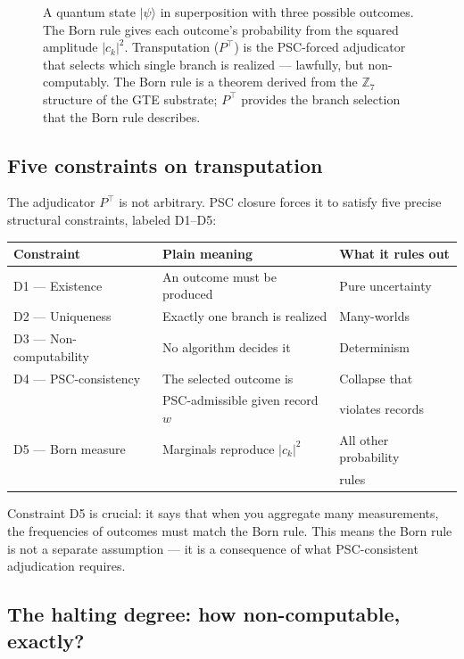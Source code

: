 \documentclass[11pt,a4paper]{article}
\begin{document}
\begin{figure}[h]
\begin{tikzpicture}
\end{tikzpicture}
\caption{A quantum state $|\psi\rangle$ in superposition with three possible outcomes.
  The Born rule gives each outcome's probability from the squared amplitude $|c_k|^2$.
  Transputation ($P^\top$) is the PSC-forced adjudicator that selects which single
  branch is realized --- lawfully, but non-computably.
  The Born rule is a theorem derived from the $\mathbb{Z}_7$ structure of the GTE substrate;
  $P^\top$ provides the branch selection that the Born rule describes.}
\label{fig:branching}
\end{figure}

\subsection{Five constraints on transputation}

The adjudicator $P^\top$ is not arbitrary.  PSC closure forces it to satisfy
five precise structural constraints, labeled D1--D5:

\begin{center}
\begin{tabular}{lll}
\toprule
Constraint & Plain meaning & What it rules out \\
\midrule
D1 --- Existence & An outcome must be produced & Pure uncertainty \\
D2 --- Uniqueness & Exactly one branch is realized & Many-worlds \\
D3 --- Non-computability & No algorithm decides it & Determinism \\
D4 --- PSC-consistency & The selected outcome is & Collapse that \\
  & PSC-admissible given record $w$ & violates records \\
D5 --- Born measure & Marginals reproduce $|c_k|^2$ & All other probability \\
  & & rules \\
\bottomrule
\end{tabular}
\end{center}

\noindent
Constraint D5 is crucial: it says that when you aggregate many measurements, the
frequencies of outcomes must match the Born rule.  This means the Born rule is
not a separate assumption --- it is a consequence of what PSC-consistent adjudication
requires.

\subsection{The halting degree: how non-computable, exactly?}
\end{document}
